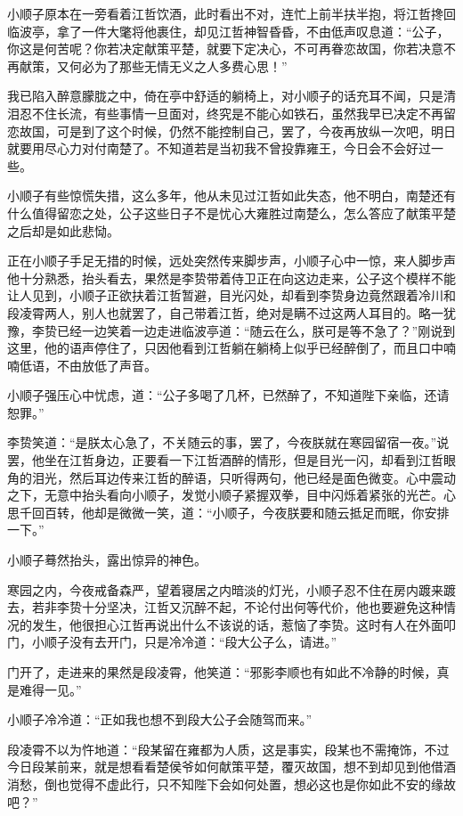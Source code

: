 小顺子原本在一旁看着江哲饮酒，此时看出不对，连忙上前半扶半抱，将江哲搀回临波亭，拿了一件大氅将他裹住，却见江哲神智昏昏，不由低声叹息道：“公子，你这是何苦呢？你若决定献策平楚，就要下定决心，不可再眷恋故国，你若决意不再献策，又何必为了那些无情无义之人多费心思！”

我已陷入醉意朦胧之中，倚在亭中舒适的躺椅上，对小顺子的话充耳不闻，只是清泪忍不住长流，有些事情一旦面对，终究是不能心如铁石，虽然我早已决定不再留恋故国，可是到了这个时候，仍然不能控制自己，罢了，今夜再放纵一次吧，明日就要用尽心力对付南楚了。不知道若是当初我不曾投靠雍王，今日会不会好过一些。

小顺子有些惊慌失措，这么多年，他从未见过江哲如此失态，他不明白，南楚还有什么值得留恋之处，公子这些日子不是忧心大雍胜过南楚么，怎么答应了献策平楚之后却是如此悲恸。

正在小顺子手足无措的时候，远处突然传来脚步声，小顺子心中一惊，来人脚步声他十分熟悉，抬头看去，果然是李贽带着侍卫正在向这边走来，公子这个模样不能让人见到，小顺子正欲扶着江哲暂避，目光闪处，却看到李贽身边竟然跟着冷川和段凌霄两人，别人也就罢了，自己带着江哲，绝对是瞒不过这两人耳目的。略一犹豫，李贽已经一边笑着一边走进临波亭道：“随云在么，朕可是等不急了？”刚说到这里，他的语声停住了，只因他看到江哲躺在躺椅上似乎已经醉倒了，而且口中喃喃低语，不由放低了声音。

小顺子强压心中忧虑，道：“公子多喝了几杯，已然醉了，不知道陛下亲临，还请恕罪。”

李贽笑道：“是朕太心急了，不关随云的事，罢了，今夜朕就在寒园留宿一夜。”说罢，他坐在江哲身边，正要看一下江哲酒醉的情形，但是目光一闪，却看到江哲眼角的泪光，然后耳边传来江哲的醉语，只听得两句，他已经是面色微变。心中震动之下，无意中抬头看向小顺子，发觉小顺子紧握双拳，目中闪烁着紧张的光芒。心思千回百转，他却是微微一笑，道：“小顺子，今夜朕要和随云抵足而眠，你安排一下。”

小顺子蓦然抬头，露出惊异的神色。

寒园之内，今夜戒备森严，望着寝居之内暗淡的灯光，小顺子忍不住在房内踱来踱去，若非李贽十分坚决，江哲又沉醉不起，不论付出何等代价，他也要避免这种情况的发生，他很担心江哲再说出什么不该说的话，惹恼了李贽。这时有人在外面叩门，小顺子没有去开门，只是冷冷道：“段大公子么，请进。”

门开了，走进来的果然是段凌霄，他笑道：“邪影李顺也有如此不冷静的时候，真是难得一见。”

小顺子冷冷道：“正如我也想不到段大公子会随驾而来。”

段凌霄不以为忤地道：“段某留在雍都为人质，这是事实，段某也不需掩饰，不过今日段某前来，就是想看看楚侯爷如何献策平楚，覆灭故国，想不到却见到他借酒消愁，倒也觉得不虚此行，只不知陛下会如何处置，想必这也是你如此不安的缘故吧？”


